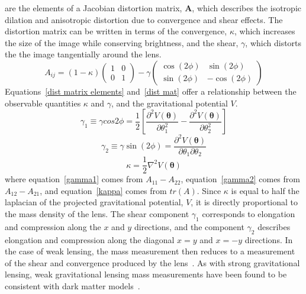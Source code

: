 are the elements of a Jacobian distortion matrix, $\mathbf{A}$, which describes the isotropic dilation and anisotropic distortion due to convergence and shear effects.  The distortion matrix can be written in terms of the convergence, $\kappa$, which increases the size of the image while conserving brightness, and the shear, $\gamma$, which distorts the the image tangentially around the lens.  
\begin{equation} \label{dist mat}
A_{ij}=(1-\kappa) \left(\begin{matrix} 1 & 0 \\ 0 & 1 \end{matrix} \right) - \gamma \left(\begin{matrix} \cos(2\phi) & \sin(2\phi) \\ \sin(2\phi) & -\cos(2\phi) \end{matrix} \right) 
\end{equation}
Equations~\ref{dist matrix elements} and~\ref{dist mat} offer a relationship between the observable quantities $\kappa$ and $\gamma$, and the gravitational potential $V$.
\begin{equation} \label{gamma1}
\gamma_1 \equiv \gamma cos 2\phi= \frac{1}{2} \left[\frac{ \partial ^2 V(\boldsymbol{\theta})}{\partial \theta_1^2} - \frac{ \partial^2 V(\boldsymbol{\theta})}{\partial \theta_2^2} \right]
\end{equation}
\begin{equation} \label{gamma2}
\gamma_2 \equiv \gamma \sin (2\phi) = \frac{ \partial^2 V(\boldsymbol{\theta})}{\partial \theta_1 \partial \theta_2}
\end{equation}
\begin{equation} \label{kappa}
\kappa = \frac{1}{2} \nabla^2 V(\boldsymbol{\theta})
\end{equation}
where equation~\ref{gamma1} comes from $A_{11}-A_{22}$, equation~\ref{gamma2} comes from $A_{12}-A_{21}$, and equation~\ref{kappa} comes from $tr(A)$.  Since $\kappa$ is equal to half the laplacian of the projected gravitational potential, $V$, it is directly proportional to the mass density of the lens.  The shear component $\gamma_1$ corresponds to elongation and compression along the $x$ and $y$ directions, and the component $\gamma_2$ describes elongation and compression along the diagonal $x=y$ and $x=-y$ directions.  In the case of weak lensing, the mass measurement then reduces to a measurement of the shear and convergence produced by the lens~\cite{Pires}. As with strong gravitational lensing, weak gravitational lensing mass measurements have been found to be consistent with dark matter models~\cite{Wu}.


